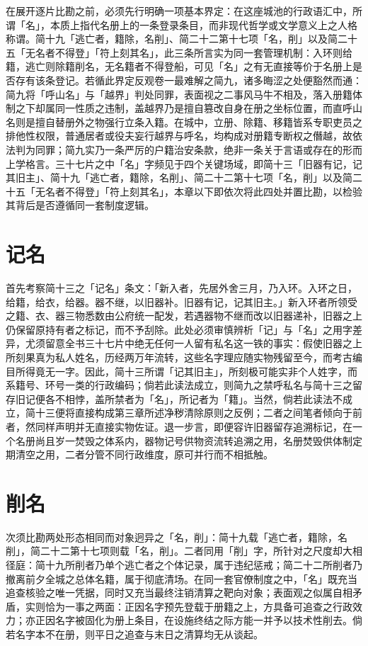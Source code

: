在展开逐片比勘之前，必须先行明确一项基本界定：在这座城池的行政语汇中，所谓「名」，本质上指代名册上的一条登录条目，而非现代哲学或文学意义上之人格称谓。简十九「逃亡者，籍除，名削」、简二十二第十七项「名，削」以及简二十五「无名者不得登」「符上刻其名」，此三条所言实为同一套管理机制：入环则给籍，逃亡则除籍削名，无名籍者不得登船，可见「名」之有无直接等价于名册上是否存有该条登记。若循此界定反观卷一最难解之简九，诸多晦涩之处便豁然而通：简九将「呼山名」与「越界」判处同罪，表面视之二事风马牛不相及，落入册籍体制之下却属同一性质之违制，盖越界乃是擅自篡改自身在册之坐标位置，而直呼山名则是擅自替册外之物强行立条入籍。在城中，立册、除籍、移籍皆系专职吏员之排他性权限，普通居者或役夫妄行越界与呼名，均构成对册籍专断权之僭越，故依法判为同罪；简九实乃一条严厉的户籍治安条款，绝非一条关于言语或存在的形而上学格言。三十七片之中「名」字频见于四个关键场域，即简十三「旧器有记，记其旧主」、简十九「逃亡者，籍除，名削」、简二十二第十七项「名，削」以及简二十五「无名者不得登」「符上刻其名」，本章以下即依次将此四处并置比勘，以检验其背后是否遵循同一套制度逻辑。

\section{记名}

首先考察简十三之「记名」条文：「新入者，先居外舍三月，乃入环。入环之日，给籍，给衣，给器。器不继，以旧器补。旧器有记，记其旧主。」新入环者所领受之籍、衣、器三物悉数由公府统一配发，若遇器物不继而改以旧器递补，旧器之上仍保留原持有者之标记，而不予刮除。此处必须审慎辨析「记」与「名」之用字差异，尤须留意全书三十七片中绝无任何一人留有私名这一铁的事实：假使旧器之上所刻果真为私人姓名，历经两万年流转，这些名字理应随实物残留至今，而考古编目所得竟无一字。因此，简十三所谓「记其旧主」，所刻极可能实非个人姓字，而系籍号、环号一类的行政编码；倘若此读法成立，则简九之禁呼私名与简十三之留存旧记便各不相悖，盖所禁者为「名」，所记者为「籍」。当然，倘若此读法不成立，简十三便将直接构成第三章所述净秽清除原则之反例；二者之间笔者倾向于前者，然同样声明并无直接实物佐证。退一步言，即便容许旧器留存追溯标记，在一个名册尚且岁一焚毁之体系内，器物记号供物资流转追溯之用，名册焚毁供体制定期清空之用，二者分管不同行政维度，原可并行而不相抵触。

\section{削名}

次须比勘两处形态相同而对象迥异之「名，削」：简十九载「逃亡者，籍除，名削」，简二十二第十七项则载「名，削」。二者同用「削」字，所针对之尺度却大相径庭：简十九所削者乃单个逃亡者之个体记录，属于违纪惩戒；简二十二所削者乃撤离前夕全城之总体名籍，属于彻底清场。在同一套官僚制度之中，「名」既充当追查核验之唯一凭据，同时又充当最终注销清算之靶向对象；表面观之似属自相矛盾，实则恰为一事之两面：正因名字预先登载于册籍之上，方具备可追查之行政效力；亦正因名字被固化为册上条目，在设施终结之际方能一并予以技术性削去。倘若名字本不在册，则平日之追查与末日之清算均无从谈起。

